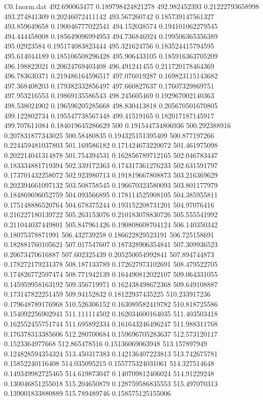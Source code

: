 \begin{filecontents}{C0.1norm.dat}
492.690063477		0.189798424821278
492.982452393		0.21222793658998
493.274841309		0.20246072411142
493.567260742		0.185739147561327
493.859649658		0.190046777022541
494.152038574		0.194101062279545
494.444458008		0.185649096994953
494.736846924		0.199506365356389
495.02923584		0.195174083823444
495.321624756		0.183524415794595
495.614044189		0.185106508296428
495.906433105		0.185916363705209
496.198822021		0.20624769403408
496.491241455		0.211720178464369
496.783630371		0.219486164596517
497.076019287		0.169823115143682
497.368408203		0.179382332856497
497.660827637		0.17607329869751
497.953216553		0.19869135586543
498.245605469		0.192967002140363
498.538024902		0.196596205285668
498.830413818		0.205670501670805
499.122802734		0.195547738567448
499.41519165		0.182017187145917
499.707611084		0.184019645286629
500		0.191544734806936
500.292388916		0.207831877343025
500.58480835		0.194325151395409
500.877197266		0.224459481037803
501.169586182		0.171424673220072
501.461975098		0.202214041314878
501.754394531		0.162856789712165
502.046783447		0.183334881719394
502.339172363		0.174317361276233
502.631591797		0.173701432258072
502.923980713		0.191819667808873
503.216369629		0.202394661097132
503.508758545		0.196670323580093
503.801177979		0.184869696052759
504.093566895		0.178114525908105
504.385955811		0.175148886520764
504.678375244		0.193152208731201
504.97076416		0.216227180139722
505.263153076		0.210183078830726
505.555541992		0.211044037449801
505.847961426		0.190808608704124
506.140350342		0.18075378871991
506.432739258		0.186622829523191
506.725158691		0.182881760105621
507.017547607		0.187328906354841
507.309936523		0.20673470616887
507.602325439		0.205250054992841
507.894744873		0.178272179231378
508.187133789		0.172627973102691
508.479522705		0.174826772597474
508.771942139		0.164490812022107
509.064331055		0.145959958163192
509.356719971		0.162438498672368
509.649108887		0.173147822251459
509.94152832		0.18122937435225
510.233917236		0.179648789176968
510.526306152		0.163089582419782
510.818725586		0.154092256902941
511.111114502		0.162034600164035
511.403503418		0.162552455751744
511.695892334		0.161643246496247
511.988311768		0.176378313385606
512.280700684		0.159696705283637
512.573120117		0.1523364977668
512.865478516		0.15136069063948
513.157897949		0.124828594354324
513.450317383		0.142136407223813
513.742675781		0.15852240116408
514.035095215		0.155775324031061
514.327514648		0.149349982725465
514.619873047		0.140709812406024
514.91229248		0.130046851255018
515.204650879		0.128759586835553
515.497070313		0.139001833880889
515.789489746		0.158575125155006

\end{filecontents}

